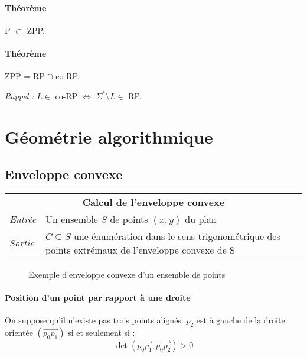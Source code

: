 \documentclass[french]{article}
\begin{document}
\paragraph{Théorème} P $\subset$ ZPP.
\paragraph{Théorème} ZPP = RP $\cap$ co-RP.

\emph{Rappel :} $L \in $ co-RP $ \Longleftrightarrow $ $\Sigma^* \setminus L \in $ RP.




\section{Géométrie algorithmique}

\subsection{Enveloppe convexe}

\vspace{0.5cm}
\begin{tabularx}{\textwidth}{p{1cm}X}
\multicolumn{2}{c}{\textbf{Calcul de l'enveloppe convexe}} \\ 
\emph{Entrée} & Un ensemble $S$ de points $(x,y)$ du plan \\ 
\emph{Sortie} & $C \subseteq S$ une énumération dans le sens trigonométrique des points extrémaux de l'enveloppe convexe de S \\
\end{tabularx}

\begin{figure}[H]
\center
{}
\caption{Exemple d'enveloppe convexe d'un ensemble de points}
\end{figure}

\paragraph{Position d'un point par rapport à une droite} On suppose qu'il n'existe pas trois points alignés. $p_2$ est à gauche de la droite orientée $(\vec{p_0p_1})$ si et seulement si :
 \[ \det(\vec{p_0p_1}, \vec{p_0p_2}) > 0 \]
 
\end{document}
